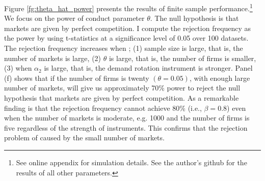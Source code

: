 \documentclass[11pt, a4paper]{article}
\begin{document}
Figure \ref{fg:theta_hat_power} presents the results of finite sample performance.\footnote{See online appendix for simulation details. See the author's github for the results of all other parameters.}
We focus on the power of conduct parameter $\theta$. 
The null hypothesis is that markets are given by perfect competition.
I compute the rejection
frequency as the power by using t-statistics at a significance level of 0.05 over 100 datasets.
The rejection
frequency increases when ; (1) sample size is large, that is, the number of markets is large, (2) $\theta$ is large, that is, the number of firms is smaller, (3) when $\alpha_2$ is large, that is, the demand rotation instrument is stronger.
Panel (f) shows that if the number of firms is twenty $(\theta=0.05)$, with enough large number of markets, will give us approximately 70\% power to reject the null hypothesis that markets are given by perfect competition.
As a remarkable finding is that the rejection frequency cannot achieve 80\% (i.e., $\beta=0.8$) even when the number of markets is moderate, e.g. 1000 and the number of firms is five regardless of the strength of instruments. 
This confirms that the rejection problem 
 of \cite{genesove1998testing} caused by the small number of markets.
\end{document}
